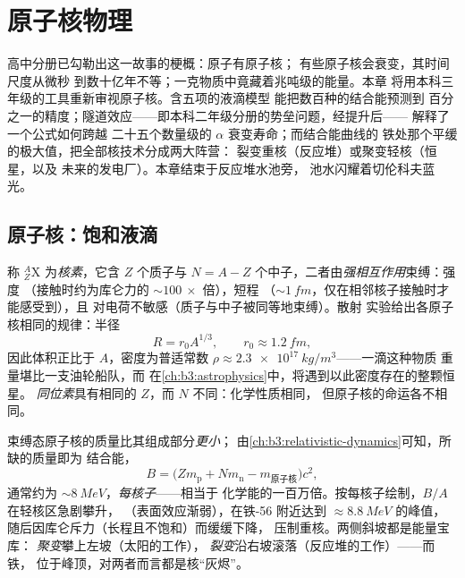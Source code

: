  \chapter{原子核物理}\label{ch:b3:nuclear-physics}


高中分册已勾勒出这一故事的梗概：原子有原子核；
有些原子核会衰变，其时间尺度从微秒
到数十亿年不等；一克物质中竟藏着兆吨级的能量。本章
将用本科三年级的工具重新审视原子核。含五项的液滴模型
能把数百种的结合能预测到
百分之一的精度；隧道效应——即本科二年级分册的势垒问题，经提升后——
解释了一个公式如何跨越
二十五个数量级的 $\alpha$ 衰变寿命；而结合能曲线的
铁处那个平缓的极大值，把全部核技术分成两大阵营：
裂变重核（反应堆）或聚变轻核（恒星，以及
未来的发电厂）。本章结束于反应堆水池旁，
池水闪耀着切伦科夫蓝光。

\section{原子核：饱和液滴}

\begin{definition}[核素、大小与密度]\label{def:b3:nuclear-physics:nuclide}
称 $^{A}_{Z}\text{X}$ 为\emph{核素}，它含 $Z$ 个质子与 $N = A -
Z$ 个中子，二者由\emph{强相互作用}束缚：强度
（接触时约为库仑力的 ${\sim}\qty{100}{}\times$ 倍），短程
（${\sim}\qty{1}{fm}$，仅在相邻核子接触时才能感受到），且
对电荷不敏感（质子与中子被同等地束缚）。散射
实验给出各原子核相同的规律：半径
\[
R = r_0A^{1/3} , \qquad r_0 \approx \qty{1.2}{fm} ,
\]
因此体积正比于 $A$，密度为普适常数
$\rho \approx \qty{2.3e17}{kg/m^3}$——一滴这种物质
重量堪比一支油轮船队，而
在\cref{ch:b3:astrophysics}中，将遇到以此密度存在的整颗恒星。
\emph{同位素}具有相同的 $Z$，而 $N$ 不同：化学性质相同，
但原子核的命运各不相同。
\end{definition}

\begin{proposition}[质量亏损与结合能]\label{prop:b3:nuclear-physics:binding}
束缚态原子核的质量比其组成部分\emph{更小}；
由\cref{ch:b3:relativistic-dynamics}可知，所缺的质量即为
结合能，
\[
B = \big(Zm_{\text{p}} + Nm_{\text{n}} - m_{\text{原子核}}\big)c^2 ,
\]
通常约为 ${\sim}\qty{8}{MeV}$，\emph{每核子}——相当于
化学能的一百万倍。按每核子绘制，$B/A$ 在轻核区急剧攀升，
（表面效应渐弱），在铁-56 附近达到 $\approx\qty{8.8}{MeV}$ 的峰值，
随后因库仑斥力（长程且不饱和）而缓缓下降，
压制重核。两侧斜坡都是能量宝库：
\emph{聚变}攀上左坡（太阳的工作），
\emph{裂变}沿右坡滚落（反应堆的工作）——而铁，
位于峰顶，对两者而言都是核“灰烬”。
\end{proposition}

